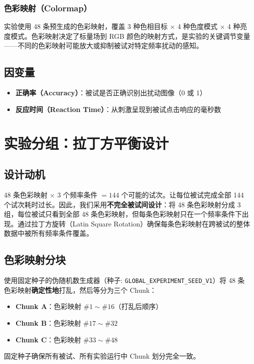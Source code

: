 \documentclass{article}
\begin{document}
\subsubsection{色彩映射（Colormap）}
实验使用 48 条预生成的色彩映射，覆盖 3 种色相目标 $\times$ 4 种色度模式 $\times$ 4 种亮度模式。色彩映射决定了标量场到 RGB 颜色的映射方式，是实验的关键调节变量——不同的色彩映射可能放大或抑制被试对特定频率扰动的感知。

\subsection{因变量}
\begin{itemize}
    \item \textbf{正确率（Accuracy）}：被试是否正确识别出扰动图像（0 或 1）
    \item \textbf{反应时间（Reaction Time）}：从刺激呈现到被试点击响应的毫秒数
\end{itemize}


\section{实验分组：拉丁方平衡设计}

\subsection{设计动机}
48 条色彩映射 $\times$ 3 个频率条件 $= 144$ 个可能的试次。让每位被试完成全部 144 个试次耗时过长。因此，我们采用\textbf{不完全被试间设计}：将 48 条色彩映射分成 3 组，每位被试只看到全部 48 条色彩映射，但每条色彩映射只在一个频率条件下出现。通过拉丁方旋转（Latin Square Rotation）确保每条色彩映射在跨被试的整体数据中被所有频率条件覆盖。

\subsection{色彩映射分块}
使用固定种子的伪随机数生成器（种子: \texttt{GLOBAL\_EXPERIMENT\_SEED\_V1}）将 48 条色彩映射\textbf{确定性地}打乱，然后等分为三个 Chunk：
\begin{itemize}
    \item \textbf{Chunk A}：色彩映射 $\#1 \sim \#16$（打乱后顺序）
    \item \textbf{Chunk B}：色彩映射 $\#17 \sim \#32$
    \item \textbf{Chunk C}：色彩映射 $\#33 \sim \#48$
\end{itemize}
固定种子确保所有被试、所有实验运行中 Chunk 划分完全一致。
\end{document}
